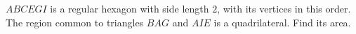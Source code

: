 $ABCEGI$ is a regular hexagon with side length $2$, with its vertices in this order. The region common to triangles $BAG$ and $AIE$ is a quadrilateral. Find its area.
